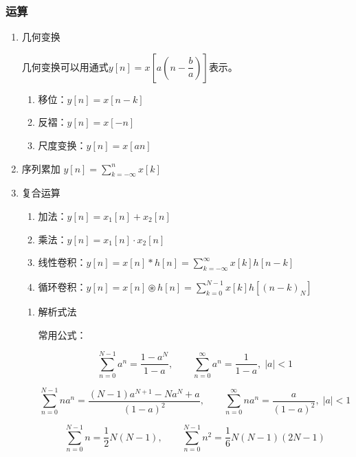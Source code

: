 \documentclass[UTF8,fontset=fandol,zihao=5]{ctexart}
\begin{document}
\subsubsection{运算}

\begin{enumerate}

  \item 几何变换
    
  几何变换可以用通式$\displaystyle y[n]=x\left [ a\left ( n - \dfrac{b}{a} \right ) \right ]$表示。
    
    \begin{enumerate}[label=(\arabic*)]
      \item 移位：$y[n]=x[n-k]$
      \item 反褶：$y[n]=x[-n]$
      \item 尺度变换：$y[n]=x[an]$
    \end{enumerate}

  \item 序列累加 $\displaystyle y[n]=\sum_{k=-\infty}^{n} x[k]$
  
  \item 复合运算
    \begin{enumerate}[label=(\arabic*)]
      \item 加法：$y[n]=x_1[n] + x_2[n]$
      \item 乘法：$y[n]=x_1[n] \cdot x_2[n]$
      \item 线性卷积：$y[n]=x[n] \ast h[n] = \displaystyle \sum_{k=-\infty}^{\infty} x[k] h[n-k]$
      \item 循环卷积：$y[n]=x[n] \circledast h[n] = \displaystyle \sum_{k=0}^{N-1}x[k]h[(n-k)_N]$
    \end{enumerate}
  
  \begin{methodbox}[【技巧】线性卷积计算]
    \begin{enumerate}[label=\arabic*.]
      \item 解析式法
      
      常用公式：
      
      \[
      \sum_{n=0}^{N-1} a^n = \frac{1-a^N}{1-a}, \qquad
      \sum_{n=0}^{\infty} a^n = \frac{1}{1-a}, \; |a|<1
      \]

      \[
      \sum_{n=0}^{N-1} n a^n = \frac{(N-1)a^{N+1}-Na^N+a}{(1-a)^2}, \qquad
      \sum_{n=0}^{\infty} n a^n = \frac{a}{(1-a)^2}, \; |a|<1
      \]

      \[
      \sum_{n=0}^{N-1} n = \frac{1}{2}N(N-1),\qquad
      \sum_{n=0}^{N-1} n^2 = \frac{1}{6}N(N-1)(2N-1)
      \]


\end{enumerate}
\end{methodbox}
\end{enumerate}
\end{document}
